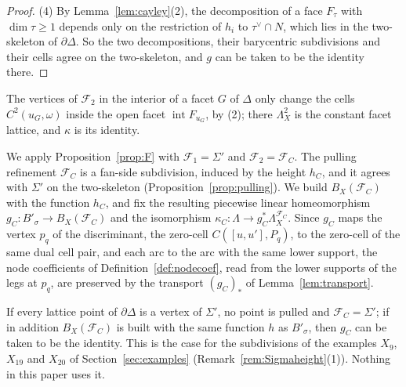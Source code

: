 \begin{proof}
(4) By Lemma~\ref{lem:cayley}(2), the decomposition of a face $F_\tau$ with $\dim\tau\ge1$ depends only on the restriction
of $h_i$ to $\tau^\vee\cap N$, which lies in the two-skeleton of $\partial\Delta$. So the two decompositions, their
barycentric subdivisions and their cells agree on the two-skeleton, and $g$ can be taken to be the identity there.
\end{proof}

The vertices of $\mathcal F_2$ in the interior of a facet $G$ of $\Delta$ only change the cells $C^2(u_G,\omega)$ inside the
open facet $\operatorname{int}F_{u_G}$, by (2); there $\Lambda^2_X$ is the constant facet lattice, and $\kappa$ is its
identity.

We apply Proposition~\ref{prop:F} with $\mathcal F_1=\Sigma'$ and $\mathcal F_2=\mathcal F_C$. The pulling refinement
$\mathcal F_C$ is a fan-side subdivision, induced by the height $h_C$, and it agrees with $\Sigma'$ on the two-skeleton
(Proposition~\ref{prop:pulling}). We build $B_X(\mathcal F_C)$ with the function $h_C$, and fix the resulting piecewise
linear homeomorphism $g_C\colon B'_\sigma\to B_X(\mathcal F_C)$ and the isomorphism $\kappa_C\colon\Lambda\to g_C^*\Lambda^{\mathcal F_C}_X$. Since $g_C$ maps the vertex $p_q$ of the discriminant,
the zero-cell $C([u,u'],P_q)$, to the zero-cell of the same dual cell pair, and each arc to the arc with the same lower support,
the node coefficients of Definition~\ref{def:nodecoef}, read from the lower supports of the legs at $p_q$, are preserved by
the transport $(g_C)_*$ of Lemma~\ref{lem:transport}.

\begin{remark}\label{rem:gCid}
If every lattice point of $\partial\Delta$ is a vertex of $\Sigma'$, no point is pulled and $\mathcal F_C=\Sigma'$; if in
addition $B_X(\mathcal F_C)$ is built with the same function $h$ as $B'_\sigma$, then $g_C$ can be taken to be the identity.
This is the case for the subdivisions of the examples $X_9$, $X_{19}$ and $X_{20}$ of Section~\ref{sec:examples}
(Remark~\ref{rem:Sigmaheight}(1)). Nothing in this paper uses it.
\end{remark}

